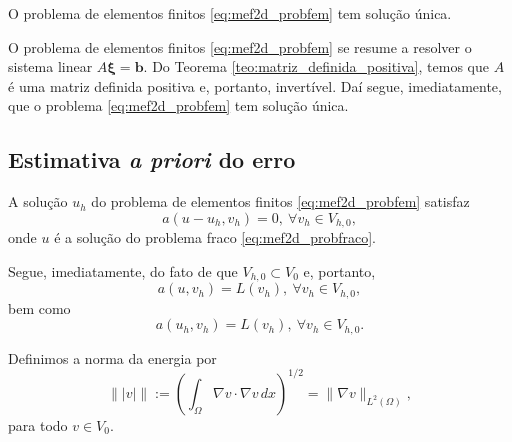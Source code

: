 \begin{teo}
  O problema de elementos finitos \eqref{eq:mef2d_probfem} tem solução única.
\end{teo}
\begin{dem}
  O problema de elementos finitos \eqref{eq:mef2d_probfem} se resume a resolver o sistema linear $A\pmb{\xi} = \pmb{b}$. Do Teorema \ref{teo:matriz_definida_positiva}, temos que $A$ é uma matriz definida positiva e, portanto, invertível. Daí segue, imediatamente, que o problema \eqref{eq:mef2d_probfem} tem solução única.
\end{dem}

\subsection{Estimativa {\it a priori} do erro}
\badgeRevisar

\begin{teo}\label{teo:mef2d_orto_Galergin}
  A solução $u_h$ do problema de elementos finitos \eqref{eq:mef2d_probfem} satisfaz
  \begin{equation}
    a(u-u_h,v_h) = 0,~\forall v_h\in V_{h,0},
  \end{equation}
onde $u$ é a solução do problema fraco \eqref{eq:mef2d_probfraco}.
\end{teo}
\begin{dem}
  Segue, imediatamente, do fato de que $V_{h,0}\subset V_0$ e, portanto,
  \begin{equation}
    a(u,v_h) = L(v_h),~\forall v_h\in V_{h,0},
  \end{equation}
bem como
  \begin{equation}
    a(u_h,v_h) = L(v_h),~\forall v_h\in V_{h,0}.
  \end{equation}
\end{dem}

\begin{defn}
  Definimos a norma da energia por
  \begin{equation}
    \||v|\| := \left(\int_{\Omega} \nabla v\cdot\nabla v\,dx\right)^{1/2} = \|\nabla v\|_{L^2(\Omega)},
  \end{equation}
para todo $v\in V_0$.
\end{defn}

